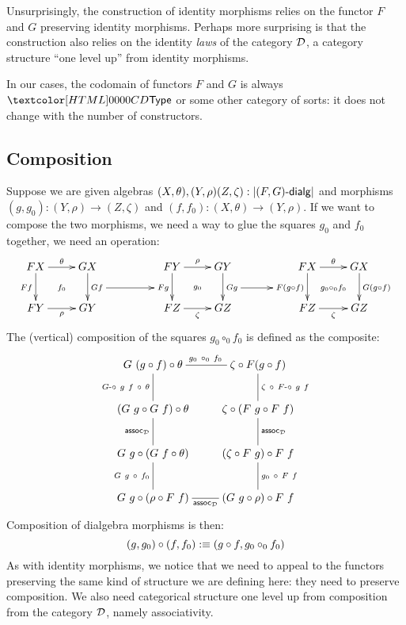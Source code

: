 Unsurprisingly, the construction of identity morphisms relies on the
functor $F$ and $G$ preserving identity morphisms. Perhaps more
surprising is that the construction also relies on the identity
\emph{laws} of the category $\mathcal{D}$, \ie a category structure ``one
level up'' from identity morphisms.

In our cases, the codomain of functors $F$ and $G$ is always $\Type$
or some other category of sorts: it does not change with the number of
constructors.

\subsection{Composition}

Suppose we are given algebras
$(X,\theta),(Y,\rho)(Z,\zeta) : | \dialgcat{F}{G} |$ and morphisms
$(g,g_0) : (Y,\rho) \to (Z,\zeta)$ and
$(f,f_0) : (X,\theta) \to (Y,\rho)$. If we want to compose the two
morphisms, we need a way to glue the squares $g_0$ and $f_0$ together,
\ie we need an operation:
$$
\xymatrix{
 FX \ar[r]^\theta \ar[d]_{F f}                 \ar@{}[dr]|{f_0} &GX \ar[d]^{G f}="Gf"
&
&FY \ar[r]^\rho   \ar[d]_{F g}="Fg"            \ar@{}[dr]|{g_0} &GY \ar[d]^{G g}="Gg"
&
&FX \ar[r]^\theta \ar[d]_{F (g \circ f)}="Fgf" \ar@{}[dr]|{g_0 \circ_0 f_0} &GX \ar[d]^{G (g \circ f)}
\\ 
 FY \ar[r]_{\rho}  &GY
&
&FZ \ar[r]_{\zeta} &GZ
&
&FZ \ar[r]_{\zeta} &GZ
\ar "Gf";"Fg"
\ar "Gg";"Fgf"
}
$$
The (vertical) composition of the squares $g_0 \circ_0 f_0$ is defined as the composite:
$$
\xymatrix{
G\ (g \circ f) \circ \theta
\ar@{-}[r]^{g_0\ \circ_0\ f_0}
\ar@{-}[d]_{\Gcomp\ g\ f\ \circ\ \theta}
&\zeta \circ F(g \circ f)
\ar@{-}[d]^{\zeta\ \circ\ \Fcomp\ g\ f}
\\
(G\ g \circ G\ f) \circ \theta
\ar@{-}[d]_{\assoc_{\Dd}}
&\zeta \circ (F\ g \circ F\ f)
\ar@{-}[d]^{\assoc_{\Dd}}
\\
G\ g \circ (G\ f \circ \theta)
\ar@{-}[d]_{G\ g\ \circ\ f_0}
&(\zeta \circ F\ g) \circ F\ f
\ar@{-}[d]^{g_0\ \circ\ F\ f}
\\
G\ g \circ (\rho \circ F\ f)
\ar@{-}[r]_{\assoc_{\Dd}}
&(G\ g \circ \rho) \circ F\ f
}
$$
Composition of dialgebra morphisms is then:
$$
(g,g_0) \circ (f,f_0) :\equiv (g \circ f , g_0 \circ_0 f_0)
$$
As with identity morphisms, we notice that we need to appeal to the
functors preserving the same kind of structure we are defining here:
they need to preserve composition. We also need categorical structure
one level up from composition from the category $\mathcal{D}$, namely
associativity.

